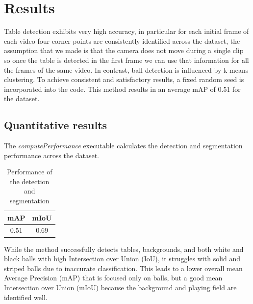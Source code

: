 \section{Results}

Table detection exhibits very high accuracy, in particular for each initial frame of each video four corner points are consistently identified across the dataset, the assumption that we made is that the camera does not move during a single clip so once the table is detected in the first frame we can use that information for all the frames of the same video.
In contrast, ball detection is influenced by k-means clustering. To achieve consistent and satisfactory results, a fixed random seed is incorporated into the code. This method results in an average mAP of 0.51 for the dataset.

\subsection{Quantitative results}
The \textit{computePerformance} executable calculates the detection and segmentation performance across the dataset.
\begin{table}
	\centering
    \begin{tabular}{|c|c|}
        \hline
        mAP & mIoU \\
        \hline
        0.51 & 0.69 \\
        \hline
    \end{tabular}
    \caption{Performance of the detection and segmentation}
    \label{tab: performance}
\end{table}
While the method successfully detects tables, backgrounds, and both white and black balls with high Intersection
over Union (IoU), it struggles with solid and striped balls due to inaccurate classification.
This leads to a lower overall mean Average Precision (mAP) that is focused only on balls,
but a good mean Intersection over Union (mIoU) because the background and playing field are identified well.

